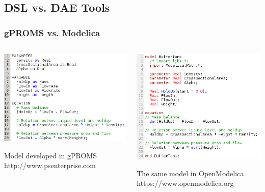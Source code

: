 \documentclass{beamer}
\begin{document}
\subsection{DSL vs. DAE Tools}
\begin{frame}
\frametitle{gPROMS vs. Modelica}
\begin{columns}[b]
  \begin{column}{0.5\paperwidth}
    \begin{center}
      \includegraphics[width=0.45\paperwidth]{../_static/gPROMS_model.png}
    \end{center}
    \begin{center}
      {\small Model developed in gPROMS\\
	      http://www.psenterprise.com}
    \end{center}
  \end{column}
  \begin{column}{0.5\paperwidth}
    \begin{center}
      \includegraphics[width=0.45\paperwidth]{../_static/modelica_model.png}
    \end{center}
    \begin{center}
      {\small The same model in OpenModelica\\
	      https://www.openmodelica.org}
    \end{center}
  \end{column}
\end{columns}
\end{frame}
\end{document}
